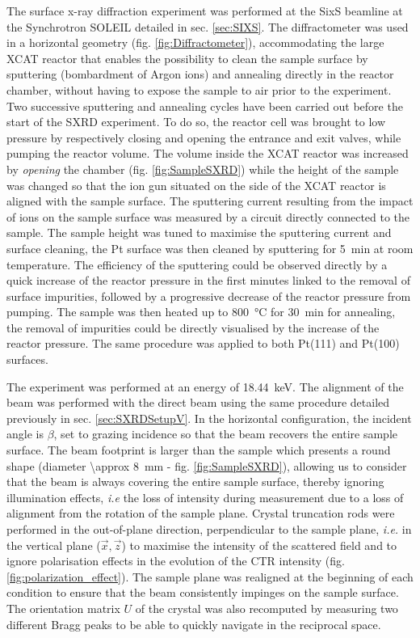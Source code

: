 The surface x-ray diffraction experiment was performed at the SixS beamline at the Synchrotron SOLEIL detailed in sec. \ref{sec:SIXS}.
The diffractometer was used in a horizontal geometry (fig. \ref{fig:Diffractometer}), accommodating the large XCAT reactor that enables the possibility to clean the sample surface by sputtering (bombardment of Argon ions) and annealing directly in the reactor chamber, without having to expose the sample to air prior to the experiment.
Two successive sputtering and annealing cycles have been carried out before the start of the SXRD experiment.
To do so, the reactor cell was brought to low pressure by respectively closing and opening the entrance and exit valves, while pumping the reactor volume.
The volume inside the XCAT reactor was increased by \textit{opening} the chamber (fig. \ref{fig:SampleSXRD}) while the height of the sample was changed so that the ion gun situated on the side of the XCAT reactor is aligned with the sample surface.
The sputtering current resulting from the impact of ions on the sample surface was measured by a circuit directly connected to the sample.
The sample height was tuned to maximise the sputtering current and surface cleaning, the Pt surface was then cleaned by sputtering for \qty{5}{\minute} at room temperature.
The efficiency of the sputtering could be observed directly by a quick increase of the reactor pressure in the first minutes linked to the removal of surface impurities, followed by a progressive decrease of the reactor pressure from pumping.
The sample was then heated up to \qty{800}{\degreeCelsius} for \qty{30}{\minute} for annealing, the removal of impurities could be directly visualised by the increase of the reactor pressure.
The same procedure was applied to both Pt(111) and Pt(100) surfaces.

The experiment was performed at an energy of \qty{18.44}{\keV}.
The alignment of the beam was performed with the direct beam using the same procedure detailed previously in sec. \ref{sec:SXRDSetupV}.
In the horizontal configuration, the incident angle is $\beta$, set to grazing incidence so that the beam recovers the entire sample surface.
The beam footprint is larger than the sample which presents a round shape (diameter \qty{\approx 8}{\mm} - fig. \ref{fig:SampleSXRD}), allowing us to consider that the beam is always covering the entire sample surface, thereby ignoring illumination effects, \textit{i.e} the loss of intensity during measurement due to a loss of alignment from the rotation of the sample plane.
Crystal truncation rods were performed in the out-of-plane direction, perpendicular to the sample plane, \textit{i.e.} in the vertical plane ($\vec{x}, \vec{z}$) to maximise the intensity of the scattered field and to ignore polarisation effects in the evolution of the CTR intensity (fig. \ref{fig:polarization_effect}).
The sample plane was realigned at the beginning of each condition to ensure that the beam consistently impinges on the sample surface.
The orientation matrix $U$ of the crystal \parencite{Schleputz2011} was also recomputed by measuring two different Bragg peaks to be able to quickly navigate in the reciprocal space.

